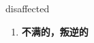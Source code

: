 
\begin{frame}
{\huge disaffected}
\begin{center}
\begin{enumerate}\Large
  \item \textbf{不满的，叛逆的}
\end{enumerate}
\end{center}
\end{frame}
